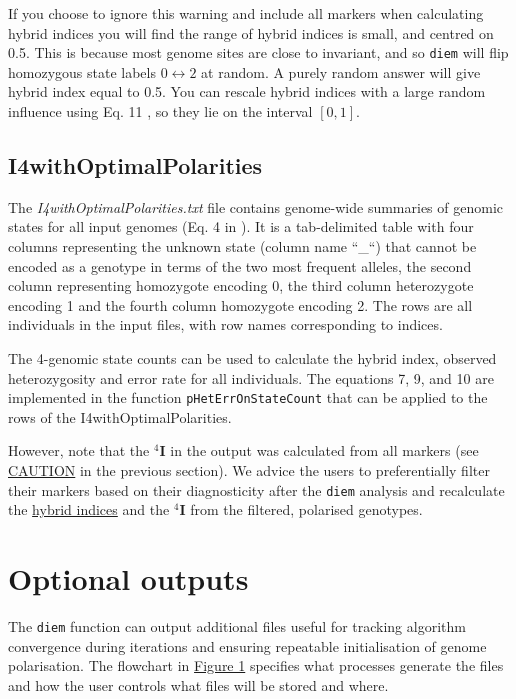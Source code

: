 \documentclass[
]{book}
\begin{document}
If you choose to ignore this warning and include all markers when calculating hybrid indices you will find the range of hybrid indices is small, and centred on 0.5. This is because most genome sites are close to invariant, and so \texttt{diem} will flip homozygous state labels \(0 \leftrightarrow 2\) at random. A purely random answer will give hybrid index equal to 0.5. You can rescale hybrid indices with a large random influence using Eq. 11 \citep{Baird2023}, so they lie on the interval \([0,1]\).

\subsection{I4withOptimalPolarities}\label{I4}

The \emph{I4withOptimalPolarities.txt} file contains genome-wide summaries of genomic states for all input genomes (Eq. 4 in \citep{Baird2023}). It is a tab-delimited table with four columns representing the unknown state (column name ``\_``) that cannot be encoded as a genotype in terms of the two most frequent alleles, the second column representing homozygote encoding 0, the third column heterozygote encoding 1 and the fourth column homozygote encoding 2. The rows are all individuals in the input files, with row names corresponding to indices.

The 4-genomic state counts can be used to calculate the hybrid index, observed heterozygosity and error rate for all individuals. The equations 7, 9, and 10 \citep{Baird2023} are implemented in the function \texttt{pHetErrOnStateCount} that can be applied to the rows of the I4withOptimalPolarities.

However, note that the \({}^4\mathbf{I}\) in the output was calculated from all markers (see \hyperref[HI]{CAUTION} in the previous section). We advice the users to preferentially filter their markers based on their diagnosticity after the \texttt{diem} analysis and recalculate the \hyperref[HI]{hybrid indices} and the \hyperref[I4]{\({}^4\mathbf{I}\)} from the filtered, polarised genotypes.

\section{Optional outputs}\label{optional-outputs}

The \texttt{diem} function can output additional files useful for tracking algorithm convergence during iterations and ensuring repeatable initialisation of genome polarisation. The flowchart in \hyperref[fig1]{Figure 1} specifies what processes generate the files and how the user controls what files will be stored and where.
\end{document}
